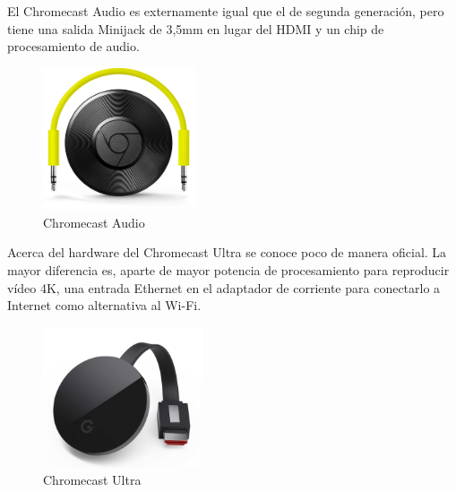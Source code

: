 El Chromecast Audio es externamente igual que el de segunda generación, pero tiene una salida Minijack de 3,5mm en lugar del HDMI y un chip de procesamiento de audio.

\begin{figure}[h]
	\centering
	\includegraphics[width=0.4\textwidth]{./Imagenes/chromecastaudio.png}
	\caption{Chromecast Audio}\label{fig:audio}
\end{figure}

Acerca del hardware del Chromecast Ultra se conoce poco de manera oficial.
La mayor diferencia es, aparte de mayor potencia de procesamiento para reproducir vídeo 4K, una entrada Ethernet en el adaptador de corriente para conectarlo a Internet como alternativa al Wi-Fi.

\begin{figure}[h]
	\centering
	\includegraphics[width=0.42\textwidth]{./Imagenes/chromecast-ultra.jpg}
	\caption{Chromecast Ultra}\label{fig:ultra}
\end{figure}
